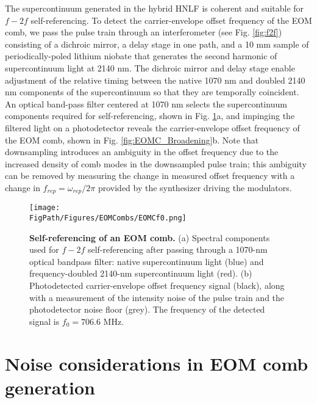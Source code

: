 The supercontinuum generated in the hybrid HNLF is coherent and suitable for $f-2f$ self-referencing. To detect the carrier-envelope offset frequency of the EOM comb, we pass the pulse train through an interferometer (see Fig. \ref{fig:f2f}) consisting of a dichroic mirror, a delay stage in one path, and a 10 mm sample of periodically-poled lithium niobate that generates the second harmonic of supercontinuum light at 2140 nm.  The dichroic mirror and delay stage enable adjustment of the relative timing between the native 1070 nm and doubled 2140 nm components of the supercontinuum so that they are temporally coincident. An optical band-pass filter centered at 1070 nm selects the supercontinuum components required for self-referencing, shown in Fig. \ref{fig:EOMC_f0}a, and impinging the filtered light on a photodetector reveals the carrier-envelope offset frequency of the EOM comb, shown in Fig. \ref{fig:EOMC_Broadening}b. Note that downsampling introduces an ambiguity in the offset frequency due to the increased density of comb modes in the downsampled pulse train; this ambiguity can be removed by measuring the change in measured offset frequency with a change in $f_{rep}=\omega_{rep}/2\pi$ provided by the synthesizer driving the modulators. 




\begin{figure}[htpb]
	\begin{center}
		\texttt{[image: \\FigPath/Figures/EOMCombs/EOMCf0.png]}
	\end{center}
	\caption[Self-referencing of an EOM comb]{\textbf{Self-referencing of an EOM comb.} (a) Spectral components used for $f-2f$ self-referencing after passing through a 1070-nm optical bandpass filter: native supercontinuum light (blue) and frequency-doubled 2140-nm supercontinuum light (red). (b) Photodetected carrier-envelope offset frequency signal (black), along with a measurement of the intensity noise of the pulse train and the photodetector noise floor (grey). The frequency of the detected signal is $f_0=706.6$ MHz.}
	\label{fig:EOMC_f0}
\end{figure} 



\section{Noise considerations in EOM comb generation}\label{sec:EOMCnoise}



